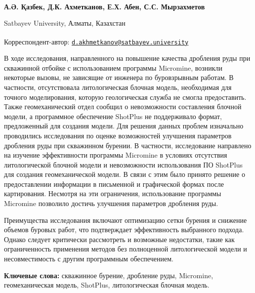\begin{articleheader}


{\bfseries А.Ә. Қазбек, Д.К. Ахметканов\textsuperscript{\envelope }, Е.Х. Абен, С.С.
Мырзахметов}
\end{articleheader}
\begin{affiliation}
Satbayev University, Алматы, Казахстан

\raggedright {\bfseries \textsuperscript{\envelope }}Корреспондент-автор: \href{mailto:d.akhmetkanov@satbayev.university}{\nolinkurl{d.akhmetkanov@satbayev.university}}
\end{affiliation}

В ходе исследования, направленного на повышение качества дробления руды
при скважинной отбойке с использованием программы Micromine, возникли
некоторые вызовы, не зависящие от инженера по буровзрывным работам. В
частности, отсутствовала литологическая блочная модель, необходимая для
точного моделирования, которую геологическая служба не смогла
предоставить. Также геомеханический отдел сообщил о невозможности
составления блочной модели, а программное обеспечение ShotPlus не
поддерживало формат, предложенный для создания модели. Для решения
данных проблем изначально проводились исследования по оценке
возможностей улучшения параметров дробления руды при скважинном бурении.
В частности, исследование направлено на изучение эффективности программы
Micromine в условиях отсутствия литологической блочной модели и
невозможности использования ПО ShotPlus для создания геомеханической
модели. В связи с этим было принято решение о предоставлении информации
в письменной и графической формах после картирования. Несмотря на эти
ограничения, использование программы Micromine позволило достичь
улучшения параметров дробления руды.

Преимущества исследования включают оптимизацию сетки бурения и снижение
объемов буровых работ, что подтверждает эффективность выбранного
подхода. Однако следует критически рассмотреть и возможные недостатки,
такие как ограниченность применения методов без полноценной
литологической модели и несовместимость с другим программным
обеспечением.

{\bfseries Ключевые слова:} скважинное бурение, дробление руды, Micromine,
геомеханическая модель, ShotPlus, литологическая блочная модель.

